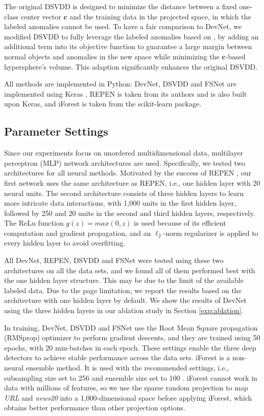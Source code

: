 \documentclass[sigconf]{acmart}
\begin{document}
The original DSVDD is designed to minimize the distance between a fixed one-class center vector $\mathbf{c}$ and the training data in the projected space, in which the labeled anomalies cannot be used. To have a fair comparison to DevNet, we modified DSVDD to fully leverage the labeled anomalies based on \cite{tax2004svdd}, by adding an additional term into its objective function to guarantee a large margin between normal objects and anomalies in the new space while minimizing the $\mathbf{c}$-based hypersphere's volume. This adaption significantly enhances the original DSVDD. 

All methods are implemented in Python: DevNet, DSVDD and FSNet are implemented using Keras \cite{chollet2015keras}, REPEN is taken from its authors and is also built upon Keras, and iForest is taken from the scikit-learn package.

\subsection{Parameter Settings}\label{sec:parameter}
Since our experiments focus on unordered multidimensional data, multilayer perceptron (MLP) network architectures are used. Specifically, we tested two architectures for all neural methods. Motivated by the success of REPEN \cite{pang2018repen}, our first network uses the same architecture as REPEN, i.e., one hidden layer with 20 neural units. The second architecture consists of three hidden layers to learn more intricate data interactions, with 1,000 units in the first hidden layer, followed by 250 and 20 units in the second and third hidden layers, respectively. The ReLu function $g(z) = \mathit{max}(0, z)$ is used because of its efficient computation and gradient propagation, and an $\ell_2$-norm regularizer is applied to every hidden layer to avoid overfitting.

All DevNet, REPEN, DSVDD and FSNet were tested using these two architectures on all the data sets, and we found all of them performed best with the one hidden layer structure. This may be due to the limit of the available labeled data. Due to the page limitation, we report the results based on the architecture with one hidden layer by default. We show the results of DevNet using the three hidden layers in our ablation study in Section \ref{exp:ablation}.





In training, DevNet, DSVDD and FSNet use the Root Mean Square propagation (RMSprop) optimizer \cite{hinton2012rmsprop} to perform gradient descents, and they are trained using 50 epochs, with 20 min-batches in each epoch. These settings enable the three deep detectors to achieve stable performance across the data sets. iForest is a non-neural ensemble method. It is used with the recommended settings, i.e., subsampling size set to 256 and ensemble size set to 100  \cite{liu2012iforest}. iForest cannot work in data with millions of features, so we use the sparse random projection \cite{li2006srp} to map \textit{URL} and \textit{news20} into a 1,000-dimensional space before applying iForest, which obtains better performance than other projection options.
\end{document}

